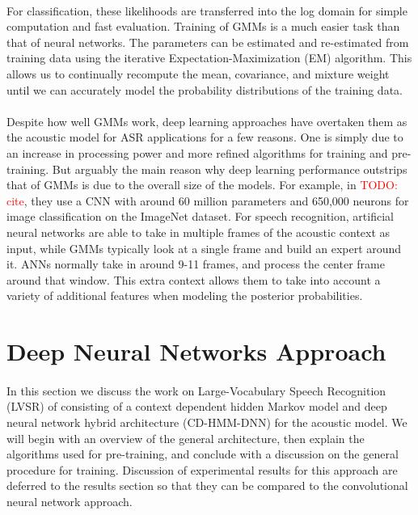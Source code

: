 \documentclass[letterpaper]{article}
\newcommand{\TODO}[1]{\textcolor{red}{TODO: #1}}
\begin{document}
\paragraph{} For classification, these likelihoods are transferred into the log domain for simple computation and fast evaluation. Training of GMMs is a much easier task than that of neural networks. The parameters can be estimated and re-estimated from training data using the iterative Expectation-Maximization (EM) algorithm. This allows us to continually recompute the mean, covariance, and mixture weight until we can accurately model the probability distributions of the training data.

\paragraph{} Despite how well GMMs work, deep learning approaches have overtaken them as the acoustic model for ASR applications for a few reasons. One is simply due to an increase in processing power and more refined algorithms for training and pre-training. But arguably the main reason why deep learning performance outstrips that of GMMs is due to the overall size of the models. For example, in \TODO{cite}, they use a CNN with around 60 million parameters and 650,000 neurons for image classification on the ImageNet dataset. For speech recognition, artificial neural networks are able to take in multiple frames of the acoustic context as input, while GMMs typically look at a single frame and build an expert around it. ANNs normally take in around 9-11 frames, and process the center frame around that window. This extra context allows them to take into account a variety of additional features when modeling the posterior probabilities. 

\section*{Deep Neural Networks Approach} 

\paragraph{} In this section we discuss the work on Large-Vocabulary Speech Recognition (LVSR) of \cite{DBLP:journals/taslp/DahlYDA12} consisting of a context dependent hidden Markov model and deep neural network hybrid architecture (CD-HMM-DNN) for the acoustic model. We will begin with an overview of the general architecture, then explain the algorithms used for pre-training, and conclude with a discussion on the general procedure for training. Discussion of experimental results for this approach are deferred to the results section so that they can be compared to the convolutional neural network approach.
\end{document}
